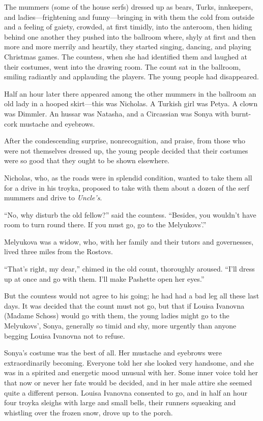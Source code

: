 The mummers (some of the house serfs) dressed up as bears, Turks,
innkeepers, and ladies---frightening and funny---bringing in with
them the cold from outside and a feeling of gaiety, crowded, at
first timidly, into the anteroom, then hiding behind one another
they pushed into the ballroom where, shyly at first and then more
and more merrily and heartily, they started singing, dancing, and
playing Christmas games.  The countess, when she had identified
them and laughed at their costumes, went into the drawing
room. The count sat in the ballroom, smiling radiantly and
applauding the players. The young people had disappeared.

Half an hour later there appeared among the other mummers in the
ballroom an old lady in a hooped skirt---this was Nicholas. A
Turkish girl was Petya. A clown was Dimmler. An hussar was
Natasha, and a Circassian was Sonya with burnt-cork mustache and
eyebrows.

After the condescending surprise, nonrecognition, and praise,
from those who were not themselves dressed up, the young people
decided that their costumes were so good that they ought to be
shown elsewhere.

Nicholas, who, as the roads were in splendid condition, wanted to
take them all for a drive in his troyka, proposed to take with
them about a dozen of the serf mummers and drive to
\emph{Uncle's}.

``No, why disturb the old fellow?'' said the countess. ``Besides,
you wouldn't have room to turn round there. If you must go, go to
the Melyukovs'.''

Melyukova was a widow, who, with her family and their tutors and
governesses, lived three miles from the Rostovs.

``That's right, my dear,'' chimed in the old count, thoroughly
aroused.  ``I'll dress up at once and go with them. I'll make
Pashette open her eyes.''

But the countess would not agree to his going; he had had a bad
leg all these last days. It was decided that the count must not
go, but that if Louisa Ivanovna (Madame Schoss) would go with
them, the young ladies might go to the Melyukovs', Sonya,
generally so timid and shy, more urgently than anyone begging
Louisa Ivanovna not to refuse.

Sonya's costume was the best of all. Her mustache and eyebrows
were extraordinarily becoming. Everyone told her she looked very
handsome, and she was in a spirited and energetic mood unusual
with her. Some inner voice told her that now or never her fate
would be decided, and in her male attire she seemed quite a
different person. Louisa Ivanovna consented to go, and in half an
hour four troyka sleighs with large and small bells, their
runners squeaking and whistling over the frozen snow, drove up to
the porch.

